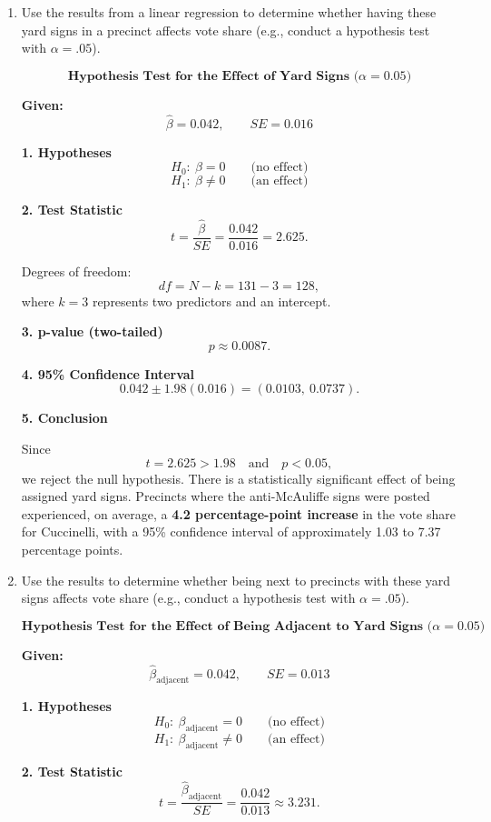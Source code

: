 \documentclass[12pt,letterpaper]{article}
\begin{document}
\vspace{.5cm}
\begin{enumerate}
	\item [(a)] Use the results from a linear regression to determine whether having these yard signs in a precinct affects vote share (e.g., conduct a hypothesis test with $\alpha = .05$).
	
	\[
	\textbf{Hypothesis Test for the Effect of Yard Signs (}\alpha = 0.05\textbf{)}
	\]
	
	\textbf{Given:}
	\[
	\hat{\beta} = 0.042, \qquad SE = 0.016
	\]
	
	\textbf{1. Hypotheses}
	\[
	H_{0}:\ \beta = 0 \qquad\text{(no effect)}
	\]
	\[
	H_{1}:\ \beta \neq 0 \qquad\text{(an effect)}
	\]
	
	\textbf{2. Test Statistic}
	\[
	t = \frac{\hat{\beta}}{SE}
	= \frac{0.042}{0.016}
	= 2.625.
	\]
	
	Degrees of freedom:
	\[
	df = N - k = 131 - 3 = 128,
	\]
	where \(k = 3\) represents two predictors and an intercept.
	
	\textbf{3. p-value (two-tailed)}
	\[
	p \approx 0.0087.
	\]
	
	\textbf{4. 95\% Confidence Interval}
	\[
	0.042 \pm 1.98(0.016)
	= (0.0103,\ 0.0737).
	\]
	
	\textbf{5. Conclusion}
	
	Since
	\[
	t = 2.625 > 1.98 \quad\text{and}\quad p < 0.05,
	\]
	we reject the null hypothesis. There is a statistically significant effect of being assigned yard signs. Precincts where the anti-McAuliffe signs were posted experienced, on average, a \textbf{4.2 percentage-point increase} in the vote share for Cuccinelli, with a 95\% confidence interval of approximately 1.03 to 7.37 percentage points.
	
	
	\newpage		
	\item [(b)]  Use the results to determine whether being
	next to precincts with these yard signs affects vote
	share (e.g., conduct a hypothesis test with $\alpha = .05$).
	
	\[
	\textbf{Hypothesis Test for the Effect of Being Adjacent to Yard Signs (}\alpha = 0.05\textbf{)}
	\]
	
	\textbf{Given:}
	\[
	\hat{\beta}_{\text{adjacent}} = 0.042, \qquad SE = 0.013
	\]
	
	\textbf{1. Hypotheses}
	\[
	H_{0}:\ \beta_{\text{adjacent}} = 0 \qquad\text{(no effect)}
	\]
	\[
	H_{1}:\ \beta_{\text{adjacent}} \neq 0 \qquad\text{(an effect)}
	\]
	
	\textbf{2. Test Statistic}
	\[
	t = \frac{\hat{\beta}_{\text{adjacent}}}{SE}
	= \frac{0.042}{0.013}
	\approx 3.231.
	\]
	

\end{enumerate}
\end{document}

